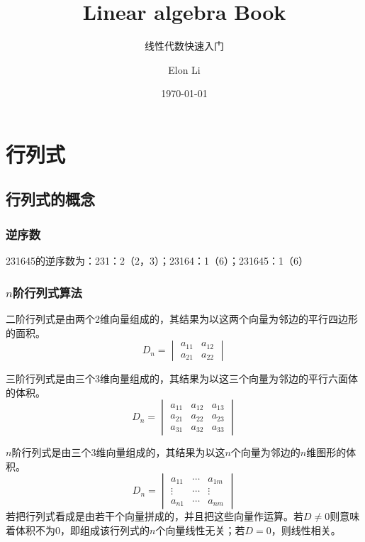 \documentclass[lang=cn,10pt]{elegantbook}
\title{Linear algebra Book}
\subtitle{线性代数快速入门}
\author{Elon Li}
\institute{Xihua Univeristy}
\date{\today}
\begin{document}
\maketitle
\frontmatter

\tableofcontents

\mainmatter

\chapter{行列式}
\section{行列式的概念}
\subsection{逆序数}
231645的逆序数为：231：2（2，3）；23164：1（6）；231645：1（6）
\subsection{$n$阶行列式算法}

\begin{definition}[二阶行列式] \label{def:2hls} 
二阶行列式是由两个2维向量组成的，其结果为以这两个向量为邻边的平行四边形的面积。
\begin{equation}
   \label{2hls}
   D_n = \begin{vmatrix}
       a_{11}&a_{12}\\
       a_{21}&a_{22}
   \end{vmatrix}
\end{equation}
\end{definition}

\begin{definition}[三阶行列式] \label{def:3hls} 
三阶行列式是由三个3维向量组成的，其结果为以这三个向量为邻边的平行六面体的体积。
\begin{equation}
   \label{3hls}
   D_n = \begin{vmatrix}
       a_{11}&a_{12}&a_{13}\\
       a_{21}&a_{22}&a_{23}\\
       a_{31}&a_{32}&a_{33}
   \end{vmatrix}
\end{equation}
\end{definition}

\begin{definition}[$n$阶行列式] \label{def:nhls} 
$n$阶行列式是由三个3维向量组成的，其结果为以这$n$个向量为邻边的$n$维图形的体积。
\begin{equation}
   \label{nhls}
   D_n = \begin{vmatrix}
       a_{11}&\cdots&a_{1m}\\
       \vdots&\cdots&\vdots\\
       a_{n1}&\cdots&a_{nm}
   \end{vmatrix}
\end{equation}
若把行列式看成是由若干个向量拼成的，并且把这些向量作运算。若$D\ne 0$则意味着体积不为0，即组成该行列式的$n$个向量线性无关；若$D = 0$，则线性相关。
\end{definition}
\end{document}
